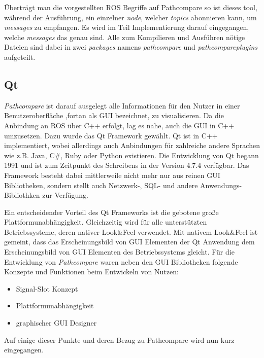 Überträgt man die vorgestellten ROS Begriffe auf Pathcompare so ist
dieses tool, während der Ausführung,
ein einzelner \textit{node}, welcher \textit{topics} abonnieren kann, um
\textit{messages} zu empfangen. Es wird im Teil Implementierung darauf
eingegangen, welche \textit{messages} das genau sind. Alle zum Kompilieren und
Ausführen nötige Dateien sind dabei in zwei \textit{packages} namens
\textit{pathcompare} und \textit{pathcompareplugins} aufgeteilt.

\subsection{Qt}

\textit{Pathcompare} ist darauf ausgelegt alle Informationen für den Nutzer in
einer Benutzeroberfläche ,fortan als GUI bezeichnet, zu visualisieren.
Da die Anbindung an ROS über C++ erfolgt, lag es nahe, auch die GUI in C++
umzusetzen. Dazu wurde das Qt Framework gewählt. Qt ist in C++ implementiert, wobei
allerdings auch Anbindungen für zahlreiche andere Sprachen wie z.B.
Java, C\#, Ruby oder Python existieren. Die Entwicklung von Qt begann 1991 und
ist zum Zeitpunkt des Schreibens in der Version 4.7.4 verfügbar. Das Framework
besteht dabei mittlerweile nicht mehr nur aus reinen GUI Bibliotheken, sondern
stellt auch Netzwerk-, SQL- und andere Anwendungs-Bibliothken zur Verfügung.

Ein entscheidender Vorteil des Qt Frameworks ist die gebotene große
Plattformunabhängigkeit.  Gleichzeitig wird für alle unterstützten
Betriebssysteme, deren nativer Look\&Feel verwendet. Mit nativem Look\&Feel
ist gemeint, dass das Erscheinungsbild von GUI Elementen der Qt Anwendung
dem Erscheinungsbild von GUI Elementen des Betriebssystems gleicht.  Für die
Entwicklung von \textit{Pathcompare} waren neben den GUI Bibliotheken 
folgende Konzepte und Funktionen beim Entwickeln von Nutzen: 
\begin{itemize}
  \item Signal-Slot Konzept
  \item Plattformunabhängigkeit
  \item graphischer GUI Designer 
\end{itemize}

Auf einige dieser Punkte und deren Bezug zu Pathcompare wird nun kurz eingegangen.

